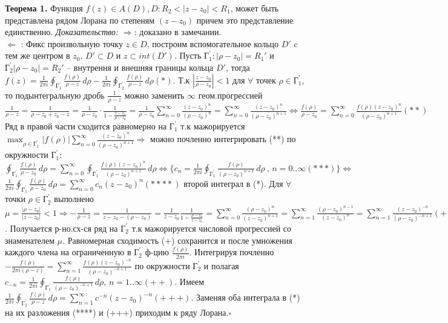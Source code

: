 \textbf{Теорема 1.}
    Функция $f(z)\in A(D), D: R_2<|z-z_0|<R_1$, может быть представлена рядом Лорана по степеням $(z-z_0)$ причем это представление единственно.
\textit{Доказательство:}
$\Longrightarrow$: доказано в замечании.\\
$\Longleftarrow$ : Фикс произвольную точку $z \in D$, построим вспомогательное кольцо $D'$ c тем же центром в $z_0$, $D' \subset D$ и $z \subset int(D')$. Пусть $\text{Г}_1^{'}: |\rho - z_0|=R_1'$ и $\text{Г}_2^{'}|\rho - z_0|=R_2'$ -- внутрення и внешняя границы кольца $D'$, тогда $f(z) = \frac{1}{2\pi i} \oint_{ \text{Г}_1^{'}} \frac{f(\rho)}{\rho - z} \,d\rho - \frac{1}{2\pi i} \oint_{ \text{Г}_2^{'}} \frac{f(\rho)}{\rho - z} \,d\rho(*)$. Т.к $|\frac{z-z_0}{\rho-z_0}|<1$ для $\forall$ точек $\rho \in \text{Г}_1^{'}$, то подынтегральную дробь $\frac{1}{\rho-z}$ можно заменить $\infty$ геом.прогрессией $\frac{1}{\rho-z} = \frac{1}{\rho-z_0+z_0-z}=\frac{1}{\rho-z_0}\cdot\frac{1}{1-\frac{z-z_0}{\rho-z_0}} = \frac{1}{\rho-z_0}\sum_{n=0}^{\infty}\frac{(z-z_0)^n}{(\rho-z_0)^n} = \sum_{n=0}^{\infty}\frac{(z-z_0)^n}{(\rho-z_0)^{n+1}} \Longleftrightarrow \frac{f(\rho)}{\rho-z_0}=\sum_{n=0}^{\infty}\frac{f(\rho)(z-z_0)^n}{(\rho-z_0)^{n+1}}(**)$ Ряд в правой части сходится равномерно на $\text{Г}_1^{'}$ т.к мажорируется $\max_{\rho \in \text{Г}_1^{'}}|f(\rho)|\sum_{n=0}^{\infty}\frac{(z-z_0)^n}{(\rho-z_0)^{n+1}} \Rightarrow$ можно почленно интегрировать (**) по окружности $\text{Г}_1^{'}$: $\oint_{ \text{Г}_1^{'}}\frac{f(\rho)}{\rho-z_0} \,d\rho =\sum_{n=0}^{\infty} \oint_{ \text{Г}_1^{'}} \frac{f(\rho)(z-z_0)^n}{(\rho-z_0)^{n+1}} \,d\rho \Longleftrightarrow \{ c_n = \frac{1}{2\pi i} \oint_{ \text{Г}_1^{'}} \frac{f(\rho)}{(\rho-z_0)^{n+1}} \,d\rho\ \text{, }n=0..\infty(***)\}\Longleftrightarrow$  $\frac{1}{2\pi i}\oint_{ \text{Г}_1^{'}}\frac{f(\rho)}{\rho-z_0} \,d\rho = \sum_{n=0}^{\infty}c_n(z-z_0)^n(****)$
\bigbreak
{} второй интеграл в (*). Для $\forall$ точки $\rho \in  \text{Г}_2^{'}$ выполнено $\mu=\frac{|\rho-z_0|}{|z-z_0|}<1 \Rightarrow -\frac{1}{\rho-z} = \frac{1}{z-z_0-(\rho-z_0)} = \frac{1}{z-z_0}\frac{1}{1-\frac{\rho-z_0}{z-z_0}}=\sum_{n=0}^{\infty}\frac{(\rho-z_0)^n}{(z-z_0)^{n+1}}=\sum_{n=1}^{\infty}\frac{(\rho-z_0)^{n-1}}{(z-z_0)^{n}}=
\sum_{n=1}^{\infty}\frac{(z-z_0)^{-n} }{(\rho-z_0)^{-n+1}}(+)$. Получается р-но.сх-ся ряд на $\text{Г}_2^{'}$ т.к мажорируется числовой прогрессией со знаменателем $\mu$. Равномерная сходимость (+) сохранится и после умножения каждого члена на ограниченную в $\text{Г}_2^{'}$ ф-цию $\frac{f(\rho)}{2\pi i}$. Интегрируя почленно $-\frac{f(\rho)}{2\pi i(\rho-z)}=\sum_{n=1}^{\infty}\frac{f(\rho)(z-z_0)^{-n} }{(\rho-z_0)^{-n+1}}$ по окружности $\text{Г}_2^{'}$ и полагая $c_{-n} = \frac{1}{2\pi i} \oint_{ \text{Г}_1^{'}} \frac{f(\rho)}{(\rho-z_0)^{-n+1}} \,d\rho \text{, }n=1..\infty (++)$. Имеем $\frac{1}{2\pi i} \oint_{ \text{Г}_2^{'}} \frac{f(\rho)}{\rho-z} \,d\rho = \sum_{n=1}^{\infty} c^{-n}(z-z_0)^{-n}(+++)$. Заменяя оба интеграла в (*) на их разложения (****) и (+++) приходим к ряду Лорана.$\square$

